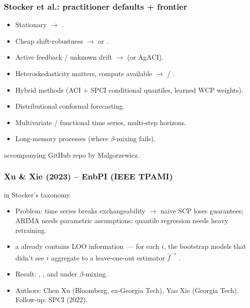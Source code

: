 \documentclass[11pt, aspectratio=169, xcolor={dvipsnames}, usepdftitle=false]{beamer}
\begin{document}
\begin{frame}
\frametitle{Stocker et al.: practitioner defaults + frontier}
\begin{itemize}
\item Stationary $\to$ .
\item Cheap shift-robustness $\to$  or .
\item Active feedback / unknown drift $\to$  (or AgACI).
\item Heteroskedasticity matters, compute available $\to$  / .
\end{itemize}
\begin{itemize}
\item Hybrid methods (ACI + SPCI conditional quantiles, learned WCP weights).
\item Distributional conformal forecasting.
\item Multivariate / functional time series, multi-step horizons.
\item Long-memory processes (where $\beta$-mixing fails).
\end{itemize}
 accompanying GitHub repo by Malgorzewicz.
\end{frame}

\begin{frame}
\frametitle{Xu \& Xie (2023) -- EnbPI (IEEE TPAMI)}
  in Stocker's taxonomy.
\begin{itemize}
\item Problem: time series breaks exchangeability $\to$ naive SCP loses guarantees; ARIMA needs parametric assumptions; quantile regression needs heavy retraining.
\item {} a  already contains LOO information~--- for each $i$, the bootstrap models that didn't see $i$ aggregate to a leave-one-out estimator $\hat{f}^{-i}$ .
\item Result: , , and  under $\beta$-mixing.
\item Authors: Chen Xu (Bloomberg, ex-Georgia Tech), Yao Xie (Georgia Tech). Follow-up: SPCI (2022).
\end{itemize}
\end{frame}
\end{document}
